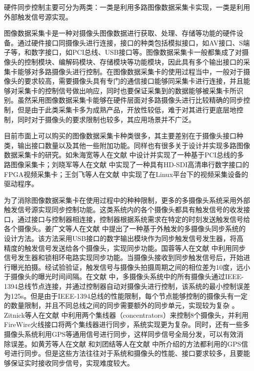 硬件同步控制主要可分为两类：一类是利用多路图像数据采集卡实现，一类是利用外部触发信号源实现。

图像数据采集卡是一种对摄像头图像数据进行获取、处理、存储等功能的硬件设备。通过硬件接口同摄像头进行连接，接口的种类包括模拟接口，如AV接口、S端子等，和数字接口，如PCI总线、USB接口等。图像数据采集卡一般都集成了对摄像头的控制模块、编解码模块、存储模块等功能模块，因此具有多个输出接口的采集卡能够对多路摄像头进行控制。在图像数据采集卡的使用过程当中，一般对于摄像头的要求较高，需要摄像头具有专门的通信接口能够同采集卡进行连接，并且能够对采集卡的控制信号做出响应，同时也要保证采集到的数据能够被采集卡所识别。虽然采用图像数据采集卡能够在硬件层面对多路摄像头进行比较精确的同步控制，但是由于此类采集卡多为成熟产品，开放性较低，难于对其进行更底层地控制，同时对于摄像头的要求限制也较多，其应用场景并不广泛。

目前市面上可以购买的图像数据采集卡种类很多，其主要差别在于摄像头接口种类，输出接口数量以及其他一些附加功能。同样也有很多关于设计并实现多路图像数据采集卡的研究。如朱海宽等人在文献 \cite{17} 中设计并实现了一种基于PCI总线的多路图像采集卡；刘晓军等人在文献 \cite{刘晓军2009采用} 中实现了一种具有HD-SDI高清串行数字接口的FPGA视频采集卡；王剑飞等人在文献 \cite{王剑非2007基于} 中实现了在Linux平台下的视频采集设备的驱动程序。

为了消除图像数据采集卡在使用过程中的种种限制，更多的多摄像头系统采用外部触发信号源实现同步控制功能。这类系统内的各个摄像头都具有触发信号的收发接口，通过接口与控制器相连接，控制器根据系统需求在特定的时刻发送触发信号给各个摄像头。姜广文等人在文献 \cite{姜广文} 中提出了一种基于外触发的多摄像头同步系统的设计方法。该方法采用USB接口的数字输出模块作为同步触发信号发生器，将高精度的触发信号发送给各个摄像头，实现同步功能。国蓉等人在文献 \cite{国蓉2014具有} 中利用同步信号发生器和锁相环电路实现同步功能。当摄像头接收到同步触发信号后，开始进行曝光拍摄。经试验验证，触发信号与摄像头拍摄周期之间的相位差为10度，远小于摄像头的曝光时间间隔。在文献 \cite{Prochazka} 中，多摄像头系统中的所有摄像头通过IEEE-1394总线节点连接，并通过控制器自动对摄像头进行控制，该系统的最小控制误差为125\textmu s。但是由于IEEE-1394总线的性能限制，每个节点能够控制的摄像头有一定的数量限制，并且不同总线之间的同步需要额外的同步单元，实现较为复杂 \cite{Litos}。Zitnick等人在文献 \cite{Zitnick} 中利用两个集线器（concentrators）来控制8个摄像头，并利用FireWire火线接口将两个集线器进行同步，系统实现更为复杂。同时，还有一些多摄像头系统利用GPS等通用信号进行同步，这样同步信号全局分发，可以有效消除误差。如黄芳等人在文献 \cite{黄芳} 和刘团结等人在文献 \cite{刘团结} 中所介绍的方法都利用的GPS信号进行同步。但是这些方法往往对于系统和摄像头的性能、接口要求较多，且要能够保证实时接收同步信号，实现难度较大。

